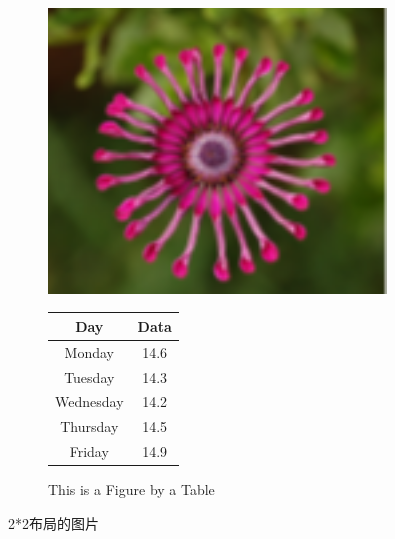 \documentclass{article}
\begin{document}
\begin{CJK}{UTF8}{gbsn}
\begin{figure}[!h] 
	\begin{minipage}[b]{0.5\textwidth} 
		\centering 
		\includegraphics[width=0.8\textwidth]{imgs/flower1.png} 
		\caption{This is a Figure by a Table} 
		\label{fig:by:table} 
	\end{minipage}%
	\begin{minipage}[b]{0.5\textwidth} 
		\centering
		\begin{tabular}{|c|c|} \hline 
			Day & Data \\ \hline\hline 
			Monday    & 14.6 \\ 
			Tuesday   & 14.3 \\ 
			Wednesday & 14.2 \\ 
			Thursday  & 14.5 \\ 
			Friday    & 14.9 \\ \hline 
		\end{tabular} 
		\label{table:by:fig} 
	\end{minipage} 
\end{figure}


2*2布局的图片


\end{CJK}
\end{document}
